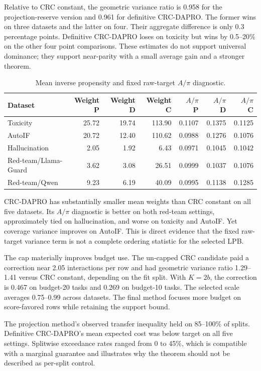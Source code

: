 \documentclass[10pt]{article}
\begin{document}
Relative to CRC constant, the geometric variance ratio is 0.958 for the
projection-reserve version and 0.961 for definitive CRC-DAPRO.  The former
wins on three datasets and the latter on four.  Their aggregate difference is
only 0.3 percentage points.  Definitive CRC-DAPRO loses on toxicity but wins
by 0.5--20\% on the other four point comparisons.  These estimates do not
support universal dominance; they support near-parity with a small average
gain and a stronger theorem.

\begin{table}[t]
\centering
\small
\caption{Mean inverse propensity and fixed raw-target $A/\pi$ diagnostic.}
\label{tab:weights}
\begin{tabular}{lrrrrrr}
\toprule
Dataset & Weight P & Weight D & Weight C & $A/\pi$ P & $A/\pi$ D & $A/\pi$ C\\
\midrule
Toxicity & 25.72 & 19.74 & 113.90 & 0.1107 & 0.1375 & 0.1125\\
AutoIF & 20.72 & 12.40 & 110.62 & 0.0988 & 0.1276 & 0.1076\\
Hallucination & 2.05 & 1.92 & 6.43 & 0.0971 & 0.1045 & 0.1042\\
Red-team/Llama-Guard & 3.62 & 3.08 & 26.51 & 0.0999 & 0.1037 & 0.1076\\
Red-team/Qwen & 9.23 & 6.19 & 40.09 & 0.0995 & 0.1138 & 0.1285\\
\bottomrule
\end{tabular}
\end{table}

CRC-DAPRO has substantially smaller mean weights than CRC constant on all
five datasets.  Its $A/\pi$ diagnostic is better on both red-team settings,
approximately tied on hallucination, and worse on toxicity and AutoIF.  Yet
coverage variance improves on AutoIF.  This is direct evidence that the fixed
raw-target variance term is not a complete ordering statistic for the
selected LPB.

The cap materially improves budget use.  The un-capped CRC candidate paid a
correction near 2.05 interactions per row and had geometric variance ratio
1.29--1.41 versus CRC constant, depending on the fit split.  With $K=2b$, the
correction is 0.467 on budget-20 tasks and 0.269 on budget-10 tasks.  The
selected scale averages 0.75--0.99 across datasets.  The final method focuses
more budget on score-favored rows while retaining the support bound.

The projection method's observed transfer inequality held on 85--100\% of
splits.  Definitive CRC-DAPRO's mean expected cost was below target on all
five settings.  Splitwise exceedance rates ranged from 0 to 45\%, which is
compatible with a marginal guarantee and illustrates why the theorem should
not be described as per-split control.
\end{document}
